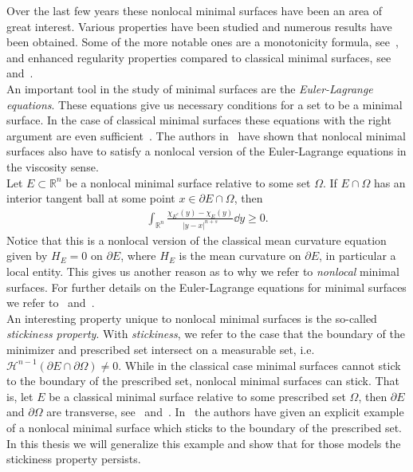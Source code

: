 Over the last few years these nonlocal minimal surfaces have been an area of great interest. Various
properties have been studied and numerous results have been obtained. Some of the more notable ones are
a monotonicity formula, see~\cite{caffarelli2009nonlocal}, and enhanced regularity properties
compared to classical minimal surfaces, see~\cite{caselli2024yaus}
and~\cite{millot2016asymptotics}. \\

An important tool in the study of minimal surfaces are the \emph{Euler-Lagrange equations}. These
equations give us necessary conditions for a set to be a minimal surface. In the case of classical
minimal surfaces these equations with the right argument are even sufficient~\cite{Maggi_2012}. The
authors in~\cite{caffarelli2009nonlocal} have shown that nonlocal minimal surfaces also have to satisfy a
nonlocal version of the Euler-Lagrange equations in the viscosity sense. \\
Let \( E \subset \mathbb{R}^n \) be a nonlocal minimal surface relative to some set \( \Omega \). If
\( E \cap \Omega \) has an interior tangent ball at some point \( x \in \partial E \cap \Omega \),
then
\begin{gather*}
	\int_{\mathbb{R}^n} \frac{\chi_{E^c} (y) - \chi_E (y)}{\lvert y-x \rvert^{n + s}} \dd{y} \geq 0.
\end{gather*}
Notice that this is a nonlocal version of the classical mean curvature equation given by \( H_E =
0 \) on \( \partial E \), where \( H_E \) is the mean curvature on \( \partial E \), in particular a
local entity. This gives us another reason as to why we refer to \emph{nonlocal} minimal surfaces.
For further details on the Euler-Lagrange equations for minimal surfaces we refer
to~\cite{caffarelli2009nonlocal} and~\cite{Maggi_2012}. \\

An interesting property unique to nonlocal minimal surfaces is the so-called \emph{stickiness
	property}. With \emph{stickiness}, we refer to the case that the boundary of the minimizer and
prescribed set intersect on a measurable set, i.e.\ \( \mathcal{H}^{n-1}(\partial E \cap \partial
\Omega) \neq 0 \). While in the classical case minimal surfaces cannot stick to the boundary of
the prescribed set, nonlocal minimal surfaces can stick. That is, let \( E \) be a classical minimal
surface relative to some prescribed set \( \Omega \), then \( \partial E \) and \( \partial \Omega
\) are transverse, see~\cite{Duzaar2000} and~\cite{hardt1979}.
In~\cite{dipierro2020disconnectedness} the authors have given an explicit example of a nonlocal
minimal surface which sticks to the boundary of the prescribed set. In this thesis we will
generalize this example and show that for those models the stickiness property persists. \\


